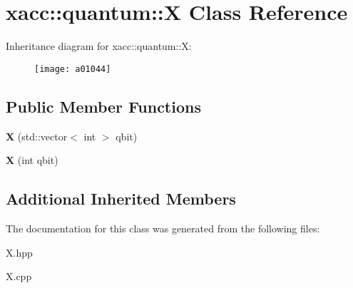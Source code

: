 \hypertarget{a01044}{}\section{xacc\+:\+:quantum\+:\+:X Class Reference}
\label{a01044}
Inheritance diagram for xacc\+:\+:quantum\+:\+:X\+:\begin{figure}[H]
\begin{center}
\leavevmode
\texttt{[image: a01044]}
\end{center}
\end{figure}
\subsection*{Public Member Functions}
\begin{DoxyCompactItemize}
\item 
\mbox{\label{a01044_aedc541a302602154847118f73b040510}} 
{\bfseries X} (std\+::vector$<$ int $>$ qbit)
\item 
\mbox{\label{a01044_a1159bd01929b59277b4524ccfcfd7440}} 
{\bfseries X} (int qbit)
\end{DoxyCompactItemize}
\subsection*{Additional Inherited Members}


The documentation for this class was generated from the following files\+:\begin{DoxyCompactItemize}
\item 
X.\+hpp\item 
X.\+cpp\end{DoxyCompactItemize}
